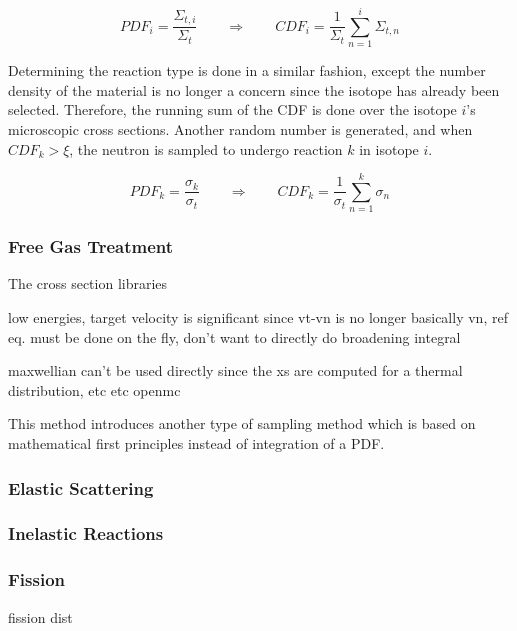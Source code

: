 \begin{equation}
\label{isotope_selection}
PDF_i = \frac{\Sigma_{t,i}}{\Sigma_t} \qquad \Rightarrow \qquad CDF_i = \frac{1}{\Sigma_t } \sum_{n=1}^i \Sigma_{t,n}
\end{equation}

Determining the reaction type is done in a similar fashion, except the number density of the material is no longer a concern since the isotope has already been selected.  Therefore, the running sum of the CDF is done over the isotope $i$'s microscopic cross sections.  Another random number is generated, and when $CDF_k > \xi$, the neutron is sampled to undergo reaction $k$ in isotope $i$.

\begin{equation}
\label{reaction_selection}
PDF_k = \frac{\sigma_k}{\sigma_t} \qquad \Rightarrow \qquad CDF_k = \frac{1}{\sigma_{t} } \sum_{n=1}^k \sigma_{n}
\end{equation}

\subsubsection{Free Gas Treatment}

The cross section libraries 

low energies, target velocity is significant since vt-vn is no longer basically vn, ref eq.  must be done on the fly, don't want to directly do broadening integral 

maxwellian can't be used directly since the xs are computed for a thermal distribution, etc etc openmc

This method introduces another type of sampling method which is based on mathematical first principles instead of integration of a PDF.  


\subsubsection{Elastic Scattering}


\subsubsection{Inelastic Reactions}


\subsubsection{Fission}

fission dist

